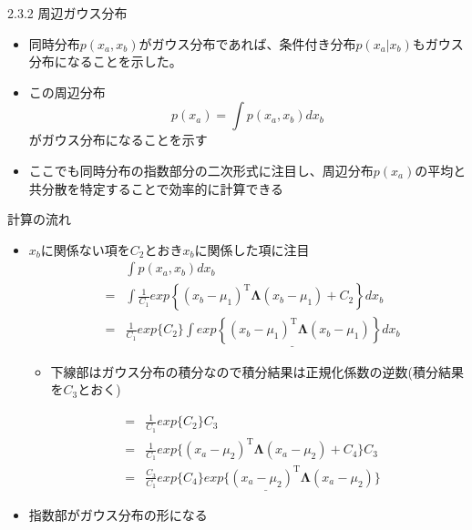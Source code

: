 \begin{frame}{2.3.2 周辺ガウス分布}
 \begin{itemize}
  \item 同時分布$p(x_a,x_b)$がガウス分布であれば、条件付き分布$p(x_a|x_b)$もガウス分布になることを示した。
  \item この周辺分布
        \begin{equation}
         p(x_a) = \int p(x_a,x_b)dx_b
        \end{equation}
        がガウス分布になることを示す
  \item ここでも同時分布の指数部分の二次形式に注目し、周辺分布$p(x_a)$の平均と共分散を特定することで効率的に計算できる
 \end{itemize}
\end{frame}


\begin{frame}{計算の流れ}
 \begin{itemize}
  \item $x_b$に関係ない項を$C_2$とおき$x_b$に関係した項に注目
        \begin{eqnarray*}
         && \int p(x_a,x_b)dx_b \\
         &=& \int \frac{1}{C_1}exp\left\{(x_b-\mu_1)^{\mathrm{T}}\bm{\Lambda}(x_b-\mu_1)+C_2\right\}dx_b \\
         &=& \frac{1}{C_1}exp\{C_2\}\underline{\int exp\left\{(x_b-\mu_1)^{\mathrm{T}}\bm{\Lambda}(x_b-\mu_1)\right\}dx_b}
        \end{eqnarray*}
        \begin{itemize}
         \item 下線部はガウス分布の積分なので積分結果は正規化係数の逆数(積分結果を$C_3$とおく)
        \end{itemize}
        \begin{eqnarray*}
         &=&\frac{1}{C_1}exp\{C_2\}C_3 \\
         &=&\frac{1}{C_1}exp\{(x_a-\mu_2)^{\mathrm{T}}\bm{\Lambda} (x_a-\mu_2)+C_4\}C_3\\
         &=&\frac{C_3}{C_1}\underline{exp\{C_4\}exp\{(x_a-\mu_2)^{\mathrm{T}}\bm{\Lambda} (x_a-\mu_2)}\}
        \end{eqnarray*}
  \item 指数部がガウス分布の形になる
 \end{itemize}
\end{frame}


